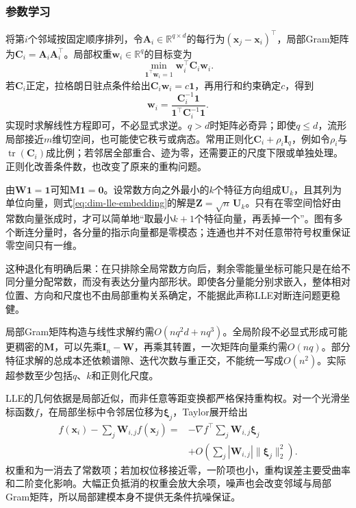 \subsubsection{参数学习}

将第$i$个邻域按固定顺序排列，令$\bm{A}_i\in\mathbb{R}^{q\times d}$的每行为$(\bm{x}_j-\bm{x}_i)^{\top}$，局部Gram矩阵为$\bm{C}_i=\bm{A}_i\bm{A}_i^{\top}$。局部权重$\bm{w}_i\in\mathbb{R}^q$的目标变为
\[
  \min_{\bm{1}^{\top}\bm{w}_i=1}
    \bm{w}_i^{\top}\bm{C}_i\bm{w}_i.
\]
若$\bm{C}_i$正定，拉格朗日驻点条件给出$\bm{C}_i\bm{w}_i=c\bm{1}$，再用行和约束确定$c$，得到
\begin{equation}
  \label{eq:dim-lle-local}
  \bm{w}_i
  =\frac{\bm{C}_i^{-1}\bm{1}}
         {\bm{1}^{\top}\bm{C}_i^{-1}\bm{1}}.
\end{equation}
实现时求解线性方程即可，不必显式求逆。$q>d$时矩阵必奇异；即使$q\leq d$，流形局部接近$m$维切空间，也可能使它秩亏或病态。常用正则化$\bm{C}_i+\rho_i\bm{I}_q$，例如令$\rho_i$与$\operatorname{tr}(\bm{C}_i)$成比例；若邻居全部重合、迹为零，还需要正的尺度下限或单独处理。正则化改善条件数，也改变了原来的重构问题。

由$\bm{W}\bm{1}=\bm{1}$可知$\bm{M}\bm{1}=\bm{0}$。设常数方向之外最小的$k$个特征方向组成$\bm{U}_k$，且其列为单位向量，则式\eqref{eq:dim-lle-embedding}的解是$\bm{Z}=\sqrt n\,\bm{U}_k$。只有在零空间恰好由常数向量张成时，才可以简单地“取最小$k+1$个特征向量，再丢掉一个”。图有多个断连分量时，各分量的指示向量都是零模态；连通也并不对任意带符号权重保证零空间只有一维。

这种退化有明确后果：在只排除全局常数方向后，剩余零能量坐标可能只是在给不同分量分配常数，而没有表达分量内部形状。即使各分量能分别求嵌入，整体相对位置、方向和尺度也不由局部重构关系确定，不能据此声称LLE对断连问题更稳健。

局部Gram矩阵构造与线性求解约需$O(nq^2d+nq^3)$。全局阶段不必显式形成可能更稠密的$\bm{M}$，可以先乘$\bm{I}_n-\bm{W}$，再乘其转置，一次矩阵向量乘约需$O(nq)$。部分特征求解的总成本还依赖谱隙、迭代次数与重正交，不能统一写成$O(n^2)$。实际超参数至少包括$q$、$k$和正则化尺度。

LLE的几何依据是局部近似，而非任意等距变换都严格保持重构权。对一个光滑坐标函数$f$，在局部坐标中令邻居位移为$\bm{\xi}_j$，Taylor展开给出
\[
  \begin{aligned}
    f(\bm{x}_i)-\sum_j\bm{W}_{i,j}f(\bm{x}_j)
    ={}&-\nabla f^{\top}\sum_j\bm{W}_{i,j}\bm{\xi}_j\\
       &+O\left(\sum_j|\bm{W}_{i,j}|
                  \lVert\bm{\xi}_j\rVert_2^2\right).
  \end{aligned}
\]
权重和为一消去了常数项；若加权位移接近零，一阶项也小，重构误差主要受曲率和二阶变化影响。大幅正负抵消的权重会放大余项，噪声也会改变邻域与局部Gram矩阵，所以局部建模本身不提供无条件抗噪保证。

